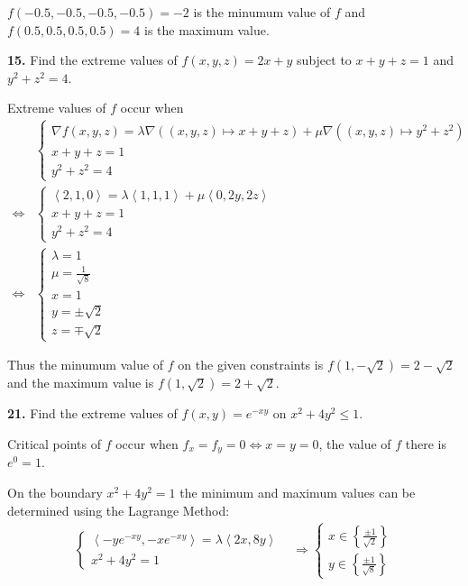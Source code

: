\documentclass[a4paper,12pt]{article}
\newcommand{\exercise}[1]{\noindent\textbf{#1.}}
\begin{document}
$f(-0.5, -0.5, -0.5, -0.5) = -2$ is the minumum value of $f$
and $f(0.5, 0.5, 0.5, 0.5) = 4$ is the maximum value.\pagebreak

\exercise{15} Find the extreme values of $f(x, y, z) = 2x + y$ subject to
$x + y + z = 1$ and $y^2 + z^2 = 4$.

Extreme values of $f$ occur when
\begin{align*}
  &\begin{cases}
    \nabla f(x, y, z) = \lambda\nabla((x, y, z) \mapsto x + y + z)
                      + \mu\nabla((x, y, z) \mapsto y^2 + z^2)\\
    x + y + z = 1\\
    y^2 + z^2 = 4
  \end{cases}\\
  \iff
  &\begin{cases}
    \left<2, 1, 0\right> = \lambda\left<1, 1, 1\right>
                         + \mu\left<0, 2y, 2z\right>\\
    x + y + z = 1\\
    y^2 + z^2 = 4
  \end{cases}\\
  \iff
  &\begin{cases}
    \lambda = 1\\
    \mu = \frac{1}{\sqrt 8}\\
    x = 1\\
    y = \pm \sqrt 2\\
    z = \mp \sqrt 2
  \end{cases}
\end{align*}

Thus the minumum value of $f$ on the given constraints is
$f(1, -\sqrt 2) = 2 - \sqrt 2$ and the maximum value is
$f(1, \sqrt 2) = 2 + \sqrt 2$.

\exercise{21} Find the extreme values of $f(x, y) = e^{-xy}$
on $x^2 + 4y^2 \leq 1$.

Critical points of $f$ occur when $f_x = f_y = 0 \iff x = y = 0$,
the value of $f$ there is $e^0 = 1$.

On the boundary $x^2 + 4y^2 = 1$ the minimum and maximum values can be
determined using the Lagrange Method:
\begin{align*}
  \begin{cases}
    \left<-ye^{-xy}, -xe^{-xy}\right> = \lambda\left<2x, 8y\right>\\
    x^2 + 4y^2 = 1
  \end{cases}
  &\Longrightarrow
  \begin{cases}
    x \in \left\{\frac{\pm 1}{\sqrt 2}\right\}\\
    y \in \left\{\frac{\pm 1}{\sqrt 8}\right\}
  \end{cases}
\end{align*}
\end{document}
